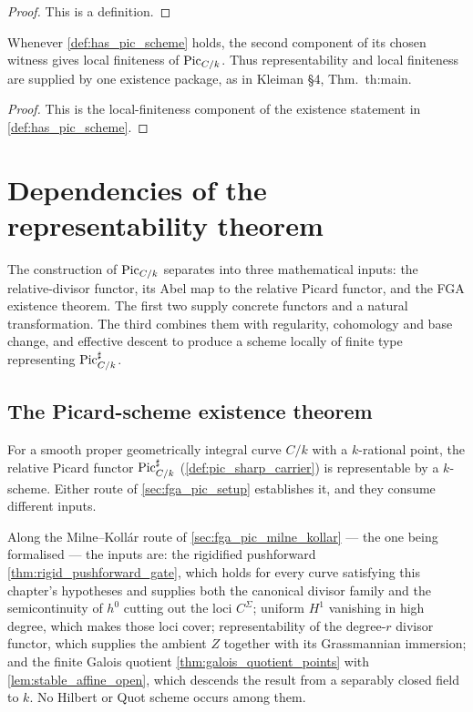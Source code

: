 \begin{proof}\leanok
  This is a definition.
\end{proof}

\begin{definition}\leanok
  \label{def:inst_pic_scheme_lft}
  Whenever \cref{def:has_pic_scheme} holds, the second component of its
  chosen witness gives local finiteness of \(\operatorname{Pic}_{C/k}\). Thus
  representability and local finiteness are supplied by one existence
  package, as in Kleiman \S 4, Thm.~th:main.
\end{definition}

\begin{proof}\leanok
  This is the local-finiteness component of the existence statement in
  \cref{def:has_pic_scheme}.
\end{proof}

\section{Dependencies of the representability theorem}
\label{sec:fga_pic_sorry_closure_order}

The construction of \(\operatorname{Pic}_{C/k}\) separates into three mathematical inputs:
the relative-divisor functor, its Abel map to the relative Picard functor, and
the FGA existence theorem. The first two supply concrete functors and a
natural transformation. The third combines them with regularity, cohomology
and base change, and effective descent to produce a scheme locally of finite
type representing \(\operatorname{Pic}^\sharp_{C/k}\).

\subsection{The Picard-scheme existence theorem}
\label{subsec:sorry_has_pic_scheme}

For a
smooth proper geometrically integral curve \(C/k\) with a \(k\)-rational
point, the relative Picard functor \(\operatorname{Pic}^\sharp_{C/k}\)
(\cref{def:pic_sharp_carrier}) is representable by a \(k\)-scheme. Either route
of \cref{sec:fga_pic_setup} establishes it, and they consume different inputs.

Along the Milne--Koll\'ar route of \cref{sec:fga_pic_milne_kollar} --- the one
being formalised --- the inputs are: the rigidified pushforward
\cref{thm:rigid_pushforward_gate}, which holds for every curve satisfying this
chapter's hypotheses and supplies both the canonical divisor family and the
semicontinuity of \(h^0\) cutting out the loci \(C^\Sigma\); uniform \(H^1\) vanishing in high degree, which makes those loci
cover; representability of the degree-\(r\) divisor functor, which supplies the
ambient \(Z\) together with its Grassmannian immersion; and the finite Galois
quotient \cref{thm:galois_quotient_points} with
\cref{lem:stable_affine_open}, which descends the result from a separably closed
field to \(k\). No Hilbert or Quot scheme occurs among them.

